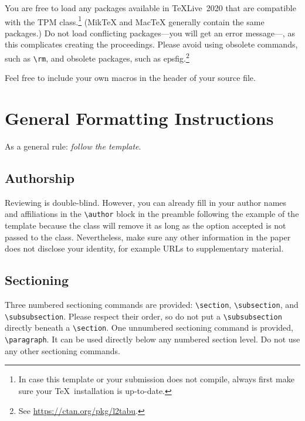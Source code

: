 \documentclass{tpm2026} %
\newcommand{\swap}[3][-]{#3#1#2} %
\begin{document}
You are free to load any packages available in \TeX{Live}~2020 that are compatible with the TPM class.\footnote{In case this template or your submission does not compile, always first make sure your \TeX\ installation is up-to-date.}
(Mik\TeX{} and Mac\TeX{} generally contain the same packages.)
Do not load conflicting packages—you will get an error message—, as this complicates creating the proceedings.
Please avoid using obsolete commands, such as \verb|\rm|, and obsolete packages, such as \textsf{epsfig}.\footnote{%
    See \url{https://ctan.org/pkg/l2tabu}.
}

\swap[ ]{in the header of your source file.}{Feel free to include your own macros}

\section{General Formatting Instructions}
As a general rule: \emph{follow the template}.

\subsection{Authorship}
Reviewing is double-blind.
However, you can already fill in your author names and affiliations in the \verb|\author| block in the preamble following the example of the template because the class will remove it as long as the option \textsf{accepted} is not passed to the class.
Nevertheless, make sure any other information in the paper does not disclose your identity, for example URLs to supplementary material.

\subsection{Sectioning}
Three numbered sectioning commands are provided: \verb|\section|, \verb|\subsection|, and \verb|\subsubsection|.
Please respect their order, so do not put a \verb|\subsubsection| directly beneath a \verb|\section|.
One unnumbered sectioning command is provided, \verb|\paragraph|.
It can be used directly below any numbered section level.
Do not use any other sectioning commands.
\end{document}
